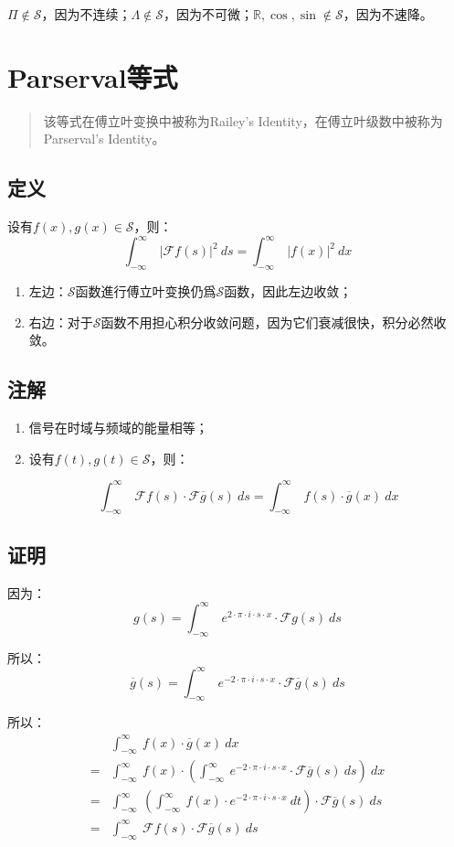 $\Pi\notin \mathcal  {S}$，因为不连续；$\Lambda\notin \mathcal  {S}$，因为不可微；$\mathbb{R},\cos,\sin \notin \mathcal  {S}$，因为不速降。

\section{Parserval等式}
\begin{quote}
	该等式在傅立叶变换中被称为Railey's Identity，在傅立叶级数中被称为Parserval's Identity。
\end{quote}
\subsection{定义}
设有$f(x),g(x)\in \mathcal  {S}$，则：
\begin{equation}
	\int_{-\infty}^{\infty}\ |\mathcal{F}f(s)|^2\ ds=\int_{-\infty}^{\infty}\ |f(x)|^2\ dx
\end{equation}
\begin{enumerate}
	\item 左边：$\mathcal  {S}$函数進行傅立叶变换仍爲$\mathcal  {S}$函数，因此左边收敛；
	\item 右边：对于$\mathcal  {S}$函数不用担心积分收敛问题，因为它们衰减很快，积分必然收敛。
\end{enumerate}
\subsection{注解}
\begin{enumerate}
	\def\labelenumi{\arabic{enumi}.}
	\item
	      信号在时域与频域的能量相等；
	\item
	      设有$f(t),g(t)\in \mathcal  {S}$，则：

	      $$
		      \int_{-\infty}^{\infty}\ \mathcal{F}f(s)\cdot \mathcal{F}\overline{g}(s)\ ds=\int_{-\infty}^{\infty}\ f(s)\cdot \overline{g}(x)\ dx
	      $$
\end{enumerate}
\subsection{证明}
因为：
$$
	g(s)=\int_{-\infty}^{\infty}\ e^{2\cdot \pi\cdot i\cdot s\cdot x}\cdot \mathcal{F}g(s)\ ds
$$

所以：
$$
	\overline{g}(s)=\int_{-\infty}^{\infty}\ e^{-2\cdot \pi\cdot i\cdot s\cdot x}\cdot \mathcal{F}\overline{g}(s)\ ds
$$

所以：
\begin{align*}
	  & \int_{-\infty}^{\infty}\ f(x)\cdot \overline{g}(x)\ dx                                                                                     \\
	= & \int_{-\infty}^{\infty}\ f(x)\cdot(\int_{-\infty}^{\infty}\ e^{-2\cdot \pi\cdot i\cdot s\cdot x}\cdot \mathcal{F}\overline{g}(s)\ ds)\ dx  \\
	= & \int_{-\infty}^{\infty}\ (\int_{-\infty}^{\infty}\ f(x)\cdot e^{-2\cdot \pi\cdot i\cdot s\cdot x}\ dt)\cdot \mathcal{F}\overline{g}(s)\ ds \\
	= & \int_{-\infty}^{\infty}\ \mathcal{F}f(s)\cdot\mathcal{F}\overline{g}(s)\ ds
\end{align*}

